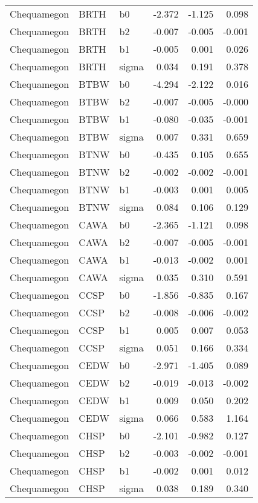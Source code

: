 \begin{table}[ht]
\begin{center}
\begin{tabular}{lllrrr}
  Chequamegon & BRTH & b0 & -2.372 & -1.125 & 0.098 \\ 
  Chequamegon & BRTH & b2 & -0.007 & -0.005 & -0.001 \\ 
  Chequamegon & BRTH & b1 & -0.005 & 0.001 & 0.026 \\ 
  Chequamegon & BRTH & sigma & 0.034 & 0.191 & 0.378 \\ 
  Chequamegon & BTBW & b0 & -4.294 & -2.122 & 0.016 \\ 
  Chequamegon & BTBW & b2 & -0.007 & -0.005 & -0.000 \\ 
  Chequamegon & BTBW & b1 & -0.080 & -0.035 & -0.001 \\ 
  Chequamegon & BTBW & sigma & 0.007 & 0.331 & 0.659 \\ 
  Chequamegon & BTNW & b0 & -0.435 & 0.105 & 0.655 \\ 
  Chequamegon & BTNW & b2 & -0.002 & -0.002 & -0.001 \\ 
  Chequamegon & BTNW & b1 & -0.003 & 0.001 & 0.005 \\ 
  Chequamegon & BTNW & sigma & 0.084 & 0.106 & 0.129 \\ 
  Chequamegon & CAWA & b0 & -2.365 & -1.121 & 0.098 \\ 
  Chequamegon & CAWA & b2 & -0.007 & -0.005 & -0.001 \\ 
  Chequamegon & CAWA & b1 & -0.013 & -0.002 & 0.001 \\ 
  Chequamegon & CAWA & sigma & 0.035 & 0.310 & 0.591 \\ 
  Chequamegon & CCSP & b0 & -1.856 & -0.835 & 0.167 \\ 
  Chequamegon & CCSP & b2 & -0.008 & -0.006 & -0.002 \\ 
  Chequamegon & CCSP & b1 & 0.005 & 0.007 & 0.053 \\ 
  Chequamegon & CCSP & sigma & 0.051 & 0.166 & 0.334 \\ 
  Chequamegon & CEDW & b0 & -2.971 & -1.405 & 0.089 \\ 
  Chequamegon & CEDW & b2 & -0.019 & -0.013 & -0.002 \\ 
  Chequamegon & CEDW & b1 & 0.009 & 0.050 & 0.202 \\ 
  Chequamegon & CEDW & sigma & 0.066 & 0.583 & 1.164 \\ 
  Chequamegon & CHSP & b0 & -2.101 & -0.982 & 0.127 \\ 
  Chequamegon & CHSP & b2 & -0.003 & -0.002 & -0.001 \\ 
  Chequamegon & CHSP & b1 & -0.002 & 0.001 & 0.012 \\ 
  Chequamegon & CHSP & sigma & 0.038 & 0.189 & 0.340 \\ 

\end{tabular}
\end{center}
\end{table}
